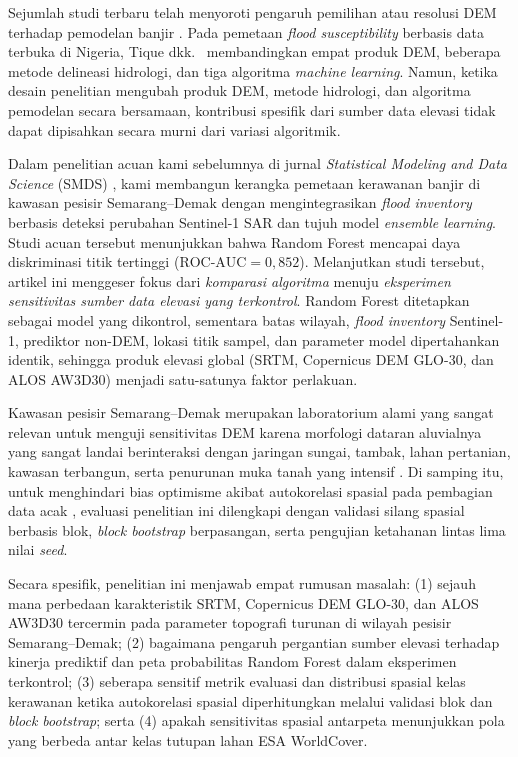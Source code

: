 \documentclass[11pt,twoside]{article}
\begin{document}
Sejumlah studi terbaru telah menyoroti pengaruh pemilihan atau resolusi DEM terhadap pemodelan banjir \cite{ali2015,fatdillah2022,fereshtehpour2024,adesina2025,fikri2026,salgado2026}. Pada pemetaan \textit{flood susceptibility} berbasis data terbuka di Nigeria, Tique dkk.\ \cite{Tique2026} membandingkan empat produk DEM, beberapa metode delineasi hidrologi, dan tiga algoritma \textit{machine learning}. Namun, ketika desain penelitian mengubah produk DEM, metode hidrologi, dan algoritma pemodelan secara bersamaan, kontribusi spesifik dari sumber data elevasi tidak dapat dipisahkan secara murni dari variasi algoritmik.

Dalam penelitian acuan kami sebelumnya di jurnal \textit{Statistical Modeling and Data Science} (SMDS) \cite{hakim2026}, kami membangun kerangka pemetaan kerawanan banjir di kawasan pesisir Semarang--Demak dengan mengintegrasikan \textit{flood inventory} berbasis deteksi perubahan Sentinel-1 SAR dan tujuh model \textit{ensemble learning}. Studi acuan tersebut menunjukkan bahwa Random Forest mencapai daya diskriminasi titik tertinggi ($\text{ROC-AUC} = 0{,}852$). Melanjutkan studi tersebut, artikel ini menggeser fokus dari \emph{komparasi algoritma} menuju \emph{eksperimen sensitivitas sumber data elevasi yang terkontrol}. Random Forest ditetapkan sebagai model yang dikontrol, sementara batas wilayah, \textit{flood inventory} Sentinel-1, prediktor non-DEM, lokasi titik sampel, dan parameter model dipertahankan identik, sehingga produk elevasi global (SRTM, Copernicus DEM GLO-30, dan ALOS AW3D30) menjadi satu-satunya faktor perlakuan.

Kawasan pesisir Semarang--Demak merupakan laboratorium alami yang sangat relevan untuk menguji sensitivitas DEM karena morfologi dataran aluvialnya yang sangat landai berinteraksi dengan jaringan sungai, tambak, lahan pertanian, kawasan terbangun, serta penurunan muka tanah yang intensif \cite{marfai2008,abidin2015,Husnayaen2018,yuwono2024,verdyansyah2025,Sakina2025}. Di samping itu, untuk menghindari bias optimisme akibat autokorelasi spasial pada pembagian data acak \cite{roberts2017,ploton2020}, evaluasi penelitian ini dilengkapi dengan validasi silang spasial berbasis blok, \textit{block bootstrap} berpasangan, serta pengujian ketahanan lintas lima nilai \textit{seed}.

Secara spesifik, penelitian ini menjawab empat rumusan masalah: (1) sejauh mana perbedaan karakteristik SRTM, Copernicus DEM GLO-30, dan ALOS AW3D30 tercermin pada parameter topografi turunan di wilayah pesisir Semarang--Demak; (2) bagaimana pengaruh pergantian sumber elevasi terhadap kinerja prediktif dan peta probabilitas Random Forest dalam eksperimen terkontrol; (3) seberapa sensitif metrik evaluasi dan distribusi spasial kelas kerawanan ketika autokorelasi spasial diperhitungkan melalui validasi blok dan \textit{block bootstrap}; serta (4) apakah sensitivitas spasial antarpeta menunjukkan pola yang berbeda antar kelas tutupan lahan ESA WorldCover.
\end{document}
